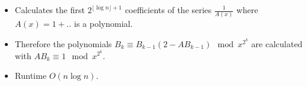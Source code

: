 \begin{itemize}
	\item Calculates the first $2^{\lfloor\log n\rfloor+1}$ coefficients of the series $\frac{1}{A(x)}$ where $A(x)=1+..$ is a polynomial.
	\item Therefore the polynomials $B_k\equiv B_{k-1}(2-AB_{k-1})\mod x^{2^k}$ are calculated with $AB_k\equiv1\mod x^{2^k}$.
	\item Runtime $O\left(n \log n\right)$.
\end{itemize}
